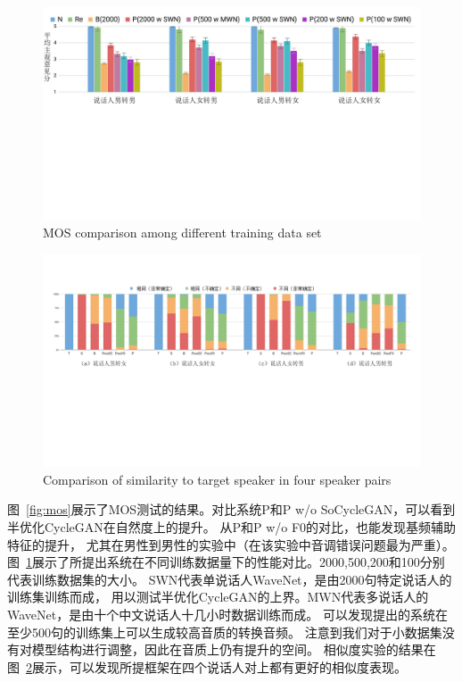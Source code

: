 \begin{figure}[!htp]
    \centering
    \includegraphics[width=13cm,trim=0 280 0 0,clip]{figure/4_mosdata.png}
    {MOS comparison among different training data set}
    \label{fig:mosdata}
\end{figure}

\begin{figure}[!htp]
    \centering
    \includegraphics[width=13cm,trim=0 250 0 50,clip]{figure/4_sim.png}
    {Comparison of similarity to target speaker in four speaker pairs}
    \label{fig:sim}
\end{figure}

图~\ref{fig:mos}展示了MOS测试的结果。对比系统P和P w/o SoCycleGAN，可以看到半优化CycleGAN在自然度上的提升。
从P和P w/o F0的对比，也能发现基频辅助特征的提升，
尤其在男性到男性的实验中（在该实验中音调错误问题最为严重）。
图~\ref{fig:mosdata}展示了所提出系统在不同训练数据量下的性能对比。2000,500,200和100分别代表训练数据集的大小。
SWN代表单说话人WaveNet，是由2000句特定说话人的训练集训练而成，
用以测试半优化CycleGAN的上界。MWN代表多说话人的WaveNet，是由十个中文说话人十几小时数据训练而成。
可以发现提出的系统在至少500句的训练集上可以生成较高音质的转换音频。
注意到我们对于小数据集没有对模型结构进行调整，因此在音质上仍有提升的空间。
相似度实验的结果在图~\ref{fig:sim}展示，可以发现所提框架在四个说话人对上都有更好的相似度表现。

